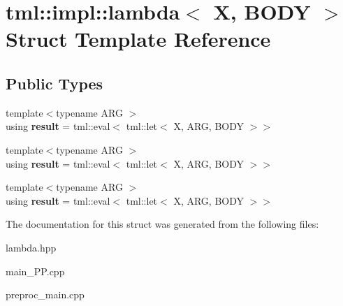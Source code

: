\hypertarget{structtml_1_1impl_1_1lambda}{\section{tml\+:\+:impl\+:\+:lambda$<$ X, B\+O\+D\+Y $>$ Struct Template Reference}
\label{structtml_1_1impl_1_1lambda}
}
\subsection*{Public Types}
\begin{DoxyCompactItemize}
\item 
\hypertarget{structtml_1_1impl_1_1lambda_a9be72e93ddc8db4863ab19e423462e27}{{\footnotesize template$<$typename A\+R\+G $>$ }\\using {\bfseries result} = tml\+::eval$<$ tml\+::let$<$ X, A\+R\+G, B\+O\+D\+Y $>$$>$}\label{structtml_1_1impl_1_1lambda_a9be72e93ddc8db4863ab19e423462e27}

\item 
\hypertarget{structtml_1_1impl_1_1lambda_a9be72e93ddc8db4863ab19e423462e27}{{\footnotesize template$<$typename A\+R\+G $>$ }\\using {\bfseries result} = tml\+::eval$<$ tml\+::let$<$ X, A\+R\+G, B\+O\+D\+Y $>$$>$}\label{structtml_1_1impl_1_1lambda_a9be72e93ddc8db4863ab19e423462e27}

\item 
\hypertarget{structtml_1_1impl_1_1lambda_a9be72e93ddc8db4863ab19e423462e27}{{\footnotesize template$<$typename A\+R\+G $>$ }\\using {\bfseries result} = tml\+::eval$<$ tml\+::let$<$ X, A\+R\+G, B\+O\+D\+Y $>$$>$}\label{structtml_1_1impl_1_1lambda_a9be72e93ddc8db4863ab19e423462e27}

\end{DoxyCompactItemize}


The documentation for this struct was generated from the following files\+:\begin{DoxyCompactItemize}
\item 
lambda.\+hpp\item 
main\+\_\+\+P\+P.\+cpp\item 
preproc\+\_\+main.\+cpp\end{DoxyCompactItemize}
